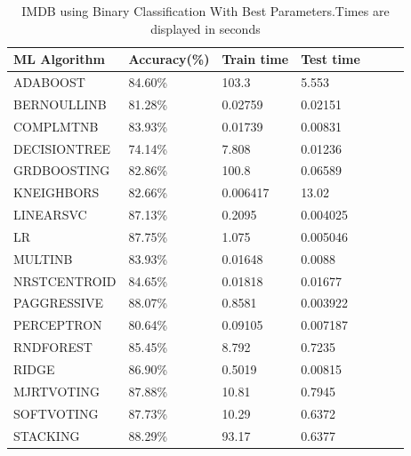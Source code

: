 \documentclass[conference]{IEEEtran}
\begin{document}
\begin{table}[H]
\caption{IMDB using Binary Classification With Best Parameters.Times are displayed in seconds}
\label{table:imdb_bin_best}
\begin{center}
\begin{adjustbox}{max width=0.99\textwidth}
\begin{tabular}{|l|l|l|l|l|l|l|}

\hline
 ML Algorithm                    & Accuracy(\%)  & Train time & Test time \\
 \hline
 ADABOOST          & 84.60\%                & 103.3                   & 5.553               \\
BERNOULLINB                   & 81.28\%                & 0.02759                 & 0.02151             \\
 COMPLMTNB                  & 83.93\%               & 0.01739                 & 0.00831             \\
 DECISIONTREE       & 74.14\%               & 7.808                   & 0.01236             \\
 GRDBOOSTING  & 82.86\%                & 100.8                   & 0.06589             \\
 KNEIGHBORS         & 82.66\%              & 0.006417                & 13.02               \\
 LINEARSVC                     & 87.13\%               & 0.2095                  & 0.004025            \\
 LR            & 87.75\%               & 1.075                   & 0.005046            \\
 MULTINB                 & 83.93\%              & 0.01648                 & 0.0088              \\
 NRSTCENTROID               & 84.65\%               & 0.01818                 & 0.01677             \\
 PAGGRESSIVE & 88.07\%             & 0.8581                  & 0.003922            \\
 PERCEPTRON                      & 80.64\%                & 0.09105                 & 0.007187            \\
RNDFOREST       & 85.45\%               & 8.792                   & 0.7235              \\
 RIDGE                & 86.90\%                & 0.5019                  & 0.00815             \\
 MJRTVOTING     & 87.88\%                & 10.81                   & 0.7945              \\
 SOFTVOTING         & 87.73\%                & 10.29                   & 0.6372              \\
 STACKING             & 88.29\%              & 93.17                   & 0.6377             \\
\hline
\end{tabular}
\end{adjustbox}
\end{center}
\end{table}
\end{document}
